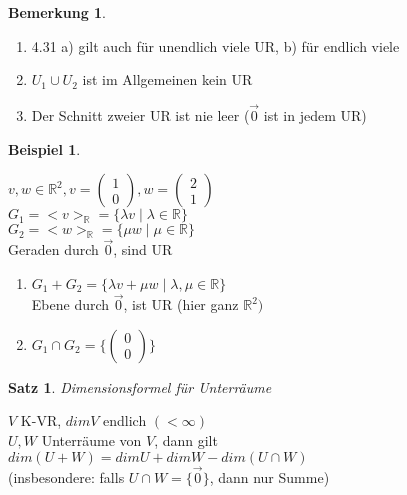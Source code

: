 \documentclass[a4paper,11pt]{article}
\newtheorem{satz}[definition]{Satz}
\newtheorem{bsp}[definition]{Beispiel}
\newtheorem{bem}[definition]{Bemerkung}
\begin{document}
\begin{bem}
\end{bem}
\begin{enumerate}[label=\alph*)]
\item 4.31 a) gilt auch für unendlich viele UR, b) für endlich viele
\item $U_1\cup U_2$ ist im Allgemeinen kein UR
\item Der Schnitt zweier UR ist nie leer ($\overset{\rightarrow}{0}$ ist in jedem UR)
\end{enumerate}
\begin{bsp}
\end{bsp}
$v,w\in\mathbb{R}^2, v=\begin{pmatrix}1\\0\end{pmatrix}, w=\begin{pmatrix}2\\1\end{pmatrix}$ \\
$G_1=<v>_{\mathbb{R}}=\{\lambda v\mid\lambda\in\mathbb{R}\}$ \\
$G_2=<w>_{\mathbb{R}}=\{\mu w\mid\mu\in\mathbb{R}\}$ \\
Geraden durch $\overset{\rightarrow}{0}$, sind UR
\begin{enumerate}[label=\alph*)]
\item $G_1+G_2=\{\lambda v+\mu w\mid\lambda,\mu\in\mathbb{R}\}$ \\
Ebene durch $\overset{\rightarrow}{0}$, ist UR (hier ganz $\mathbb{R}^2)$
\item $G_1\cap G_2=\{\begin{pmatrix}0\\0\end{pmatrix}\}$
\end{enumerate}
\begin{satz}
Dimensionsformel für Unterräume
\end{satz}
$V$ K-VR, $dimV$ endlich $(<\infty)$ \\
$U,W$ Unterräume von $V$, dann gilt $dim(U+W)=dimU+dimW-dim(U\cap W)$ \\
(insbesondere: falls $U\cap W=\{\overset{\rightarrow}{0}\}$, dann nur Summe)
\newpage
\end{document}
